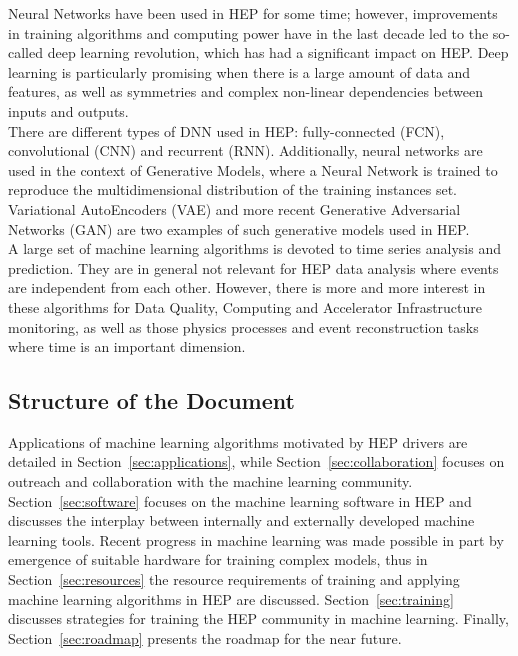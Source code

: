 Neural Networks have been used in HEP for some time; however, improvements in training algorithms and computing power have in the last decade led to the so-called deep learning
revolution, which has had a significant impact on HEP. Deep learning is particularly promising when there is a large amount of data and features, as well as symmetries and complex non-linear dependencies between inputs and outputs.\\

There are different types of DNN used in HEP: fully-connected (FCN), convolutional (CNN) and recurrent (RNN). Additionally, neural networks are used in the context of Generative Models, where a Neural Network is trained to reproduce the multidimensional distribution of the training instances set. Variational AutoEncoders (VAE) and more recent Generative Adversarial Networks (GAN) are two examples of such generative models used in HEP.\\

A large set of machine learning algorithms is devoted to time series analysis and prediction. They are in general not relevant for HEP data analysis where events are independent from each other. However, there is more and more interest in these algorithms for Data Quality, Computing and Accelerator Infrastructure monitoring, as well as those physics processes and event reconstruction tasks where time is an important dimension.


\subsection{Structure of the Document}


Applications of machine learning algorithms motivated by HEP drivers are detailed in Section~\ref{sec:applications}, while Section~\ref{sec:collaboration} focuses on outreach and collaboration with the machine learning community. Section~\ref{sec:software} focuses on the machine learning software in HEP and discusses the interplay between internally and externally developed machine learning tools. Recent progress in machine learning was made possible in part by emergence of suitable hardware for training complex models, thus in Section~\ref{sec:resources} the resource requirements of training and applying machine learning algorithms in HEP are discussed. Section~\ref{sec:training} discusses strategies for training the HEP community in machine learning.  Finally, Section~\ref{sec:roadmap} presents the roadmap for the near future.\\

